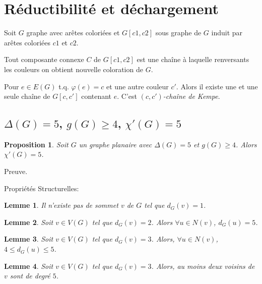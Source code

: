 \documentclass{beamer}
\newtheorem{lemme}{Lemme}
\newtheorem{proposition}{Proposition}
\begin{document}
\section{Réductibilité et déchargement}
\begin{frame}
Soit $G$ graphe avec arêtes coloriées et $G[c1,c2]$ sous graphe de $G$ induit par arêtes coloriées $c1$ et $c2$. 

Tout composante connexe $C$ de $G[c1,c2]$ est une chaîne à laquelle renversants les couleurs on obtient nouvelle coloration de $G$.

Pour $e\in E(G)$ t.q. $\varphi(e)=c$ et une autre couleur $c'$. Alors il existe une et une seule chaîne de $G[c,c']$ contenant $e$. C'est \emph{$(c, c')$-chaîne de Kempe}. 
\end{frame}

\subsection{$\Delta(G)=5$, $g(G)\geq 4$, $\chi'(G)=5$}
\begin{frame}
\begin{proposition}
Soit $G$ un graphe planaire avec $\Delta(G) = 5$ et $g(G) \geq 4$. Alors $\chi'(G)=5$.
\end{proposition}
Preuve.
\end{frame}
\begin{frame}
Propriétés Structurelles:
\begin{lemme}
Il n'existe pas de sommet $v$ de $G$ tel que $d_G(v) = 1$.
\label{le:1}
\end{lemme}
\end{frame}

\begin{frame}
\begin{lemme}
Soit $v \in V(G)$ tel que $d_G(v) = 2$. Alors $\forall u \in N(v)$, $d_G(u) = 5$.
\label{le:2}
\end{lemme}
\end{frame}

\begin{frame}
\begin{lemme}
Soit $v\in V(G)$ tel que $d_G(v) = 3$. Alors, $\forall u \in N(v)$, $4\le d_G(u) \le 5$.
\label{le:33}
\end{lemme}
\end{frame}

\begin{frame}
\begin{lemme}
Soit $v\in V(G)$ tel que $d_G(v) = 3$. Alors, au moins deux voisins de $v$ sont de degré $5$.
\label{le:434}
\end{lemme}
\end{frame}
\end{document}
